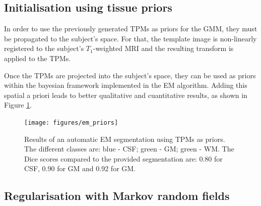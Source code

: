 
\subsection{Initialisation using tissue priors}
In order to use the previously generated TPMs as priors for the GMM, they must be propagated to the subject's space. For that, the template image is non-linearly registered to the subject's $T_1$-weighted MRI and the resulting transform is applied to the TPMs.




Once the TPMs are projected into the subject's space, they can be used as priors within the bayesian framework implemented in the EM algorithm. Adding this spatial a priori leads to better qualitative and cuantitative results, as shown in Figure \ref{fig:em-priors}.

\begin{figure}
  \centering
  \texttt{[image: figures/em\_priors]}
  \caption{Results of an automatic EM segmentation using TPMs as priors. The different classes are: blue - CSF; green - GM; green - WM. The Dice scores compared to the provided segmentation are: 0.80 for CSF, 0.90 for GM and 0.92 for GM.}
  \label{fig:em-priors}
\end{figure}



\subsection{Regularisation with Markov random fields}

